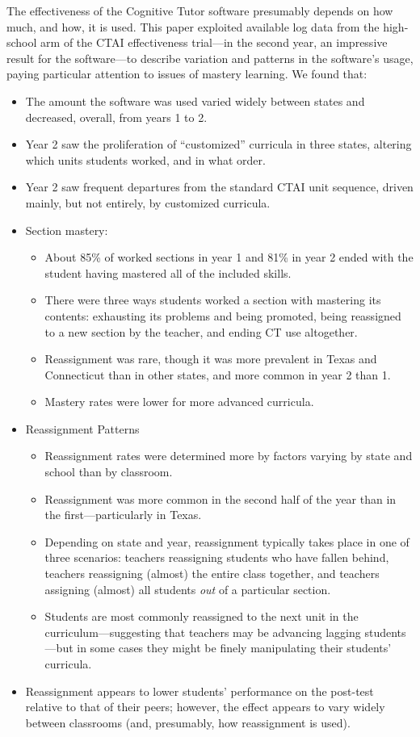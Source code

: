 \documentclass[12pt]{article}\usepackage[]{graphicx}\usepackage[]{color}
\begin{document}
The effectiveness of the Cognitive Tutor software presumably depends
on how much, and how, it is used.
This paper exploited available log data from the high-school arm of the CTAI
effectiveness trial---in the second year, an impressive result for the
software---to describe variation and patterns in the software's
usage, paying particular attention to issues of mastery learning.
We found that:
\begin{itemize}
 \item The amount the software was used varied widely between states
   and decreased, overall, from years 1 to 2.
 \item Year 2 saw the proliferation of ``customized'' curricula in
   three states, altering which units students worked, and in what
   order.
 \item Year 2 saw frequent departures from the standard CTAI unit
   sequence, driven mainly, but not entirely, by customized
   curricula.
 \item Section mastery:
 \begin{itemize}
  \item About 85\% of
    worked sections in year 1 and
    81\% in  year 2 ended
    with the student having mastered all of the included skills.
  \item There were three ways students worked a section with
    mastering its contents: exhausting its problems and being
    promoted, being reassigned to a new section by the teacher, and
    ending CT use altogether.
  \item Reassignment was rare, though it was more prevalent in Texas
    and Connecticut than in other states, and more common in year 2
    than 1.
  \item Mastery rates were lower for more advanced curricula.
 \end{itemize}
 \item Reassignment Patterns
  \begin{itemize}
   \item Reassignment rates were determined more by factors varying by state and school
     than by classroom.
   \item Reassignment was more common in the second half of the year
     than in the first---particularly in Texas.
   \item Depending on state and year, reassignment typically takes
     place in one of three scenarios: teachers reassigning students
     who have fallen behind, teachers reassigning (almost) the entire
     class together, and teachers assigning (almost) all students
     \emph{out} of a particular section.
   \item Students are most commonly reassigned to the next unit in the
     curriculum---suggesting that teachers may be advancing lagging
     students---but in some cases they might be finely manipulating
     their students' curricula.
   \end{itemize}
 \item Reassignment appears to lower students' performance on the
   post-test relative to that of their peers; however, the effect
   appears to vary widely between classrooms (and, presumably, how
   reassignment is used).
 \end{itemize}
\end{document}
